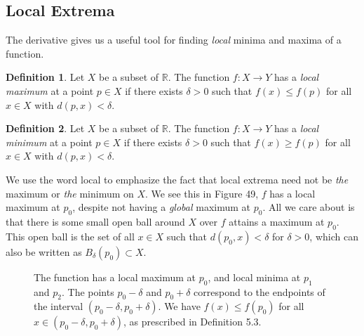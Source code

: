 \documentclass{article}
\newcommand{\R}{\mathbb{R}}
\theoremstyle{definition}
\newtheorem{definition}{Definition}[section]
\begin{document}
	\subsection{Local Extrema}
	The derivative gives us a useful tool for finding \textit{local} minima and maxima of a function. 
	\begin{definition}\label{def5.3}
		Let $ X $ be a subset of $ \R $. The function $ f:X\to Y $ has a \textit{\color{red}local maximum} at a point $ p\in X $ if there exists $ \delta>0 $ such that $ f(x)\le f(p) $ for all $ x\in X $ with $ d(p,x)<\delta $.
	\end{definition}
	\begin{definition}\label{def5.4}
		Let $ X $ be a subset of $ \R $. The function $ f:X\to Y $ has a \textit{\color{red}local minimum} at a point $ p\in X $ if there exists $ \delta>0 $ such that $ f(x)\ge f(p) $ for all $ x\in X $ with $ d(p,x)<\delta $.
	\end{definition}
	We use the word local to emphasize the fact that local extrema need not be \textit{the} maximum or \textit{the} minimum on $ X $. We see this in Figure 49, $ f $ has a local maximum at $ p_0 $, despite not having a \textit{global} maximum at $ p_0 $. All we care about is that there is some small open ball around $ X $ over $ f $ attains a maximum at $ p_0 $. This open ball is the set of all $ x\in X $ such that $ d(p_0,x)<\delta $ for $ \delta>0 $, which can also be written as $ B_\delta(p_0)\subset X $. 
	\begin{figure}[h!]
		\centering
		\caption{The function has a local maximum at $ p_0 $, and local minima at $ p_1 $ and $ p_2 $. The points $ p_0-\delta $ and $ p_0+\delta $ correspond to the endpoints of the interval $ (p_0-\delta,p_0+\delta) $. We have $ f(x)\le f(p_0) $ for all $ x\in(p_0-\delta,p_0+\delta) $, as prescribed in Definition 5.3.}
	\end{figure}
\end{document}
